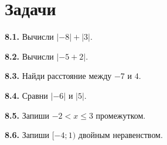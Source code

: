 \section*{Задачи}
\begingroup\setlength{\parskip}{2pt}
\noindent\begin{minipage}[t]{\linewidth}\textbf{8.1.} Вычисли \(| - 8 | + | 3 |\).\par\end{minipage}\par
\noindent\begin{minipage}[t]{\linewidth}\textbf{8.2.} Вычисли \(| - 5 + 2 |\).\par\end{minipage}\par
\noindent\begin{minipage}[t]{\linewidth}\textbf{8.3.} Найди расстояние между \(- 7\) и \(4\).\par\end{minipage}\par
\noindent\begin{minipage}[t]{\linewidth}\textbf{8.4.} Сравни \(| - 6 |\) и \(| 5 |\).\par\end{minipage}\par
\noindent\begin{minipage}[t]{\linewidth}\textbf{8.5.} Запиши \(- 2 < x \le  3\) промежутком.\par\end{minipage}\par
\noindent\begin{minipage}[t]{\linewidth}\textbf{8.6.} Запиши \([- 4;\allowbreak 1)\) двойным неравенством.\par\end{minipage}\par
